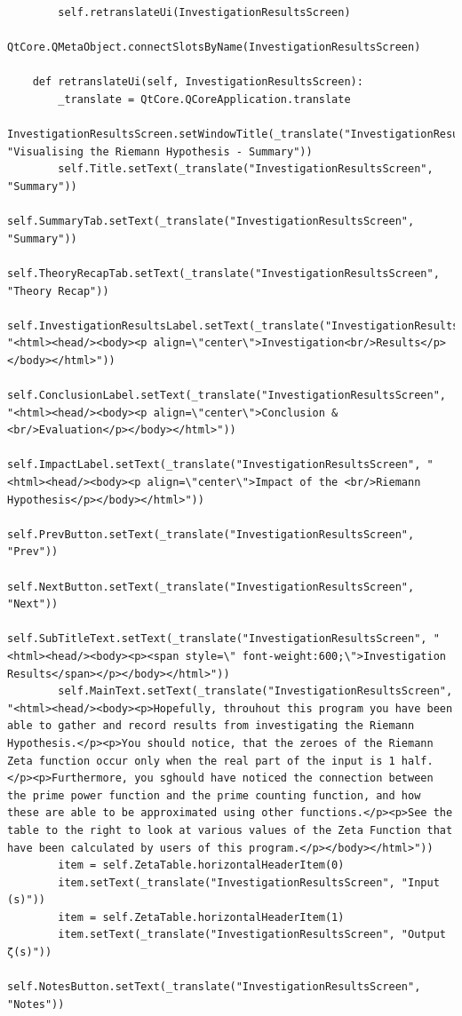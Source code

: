 \documentclass[12pt]{article}
\begin{document}
\begin{lstlisting}
        self.retranslateUi(InvestigationResultsScreen)
        QtCore.QMetaObject.connectSlotsByName(InvestigationResultsScreen)

    def retranslateUi(self, InvestigationResultsScreen):
        _translate = QtCore.QCoreApplication.translate
        InvestigationResultsScreen.setWindowTitle(_translate("InvestigationResultsScreen", "Visualising the Riemann Hypothesis - Summary"))
        self.Title.setText(_translate("InvestigationResultsScreen", "Summary"))
        self.SummaryTab.setText(_translate("InvestigationResultsScreen", "Summary"))
        self.TheoryRecapTab.setText(_translate("InvestigationResultsScreen", "Theory Recap"))
        self.InvestigationResultsLabel.setText(_translate("InvestigationResultsScreen", "<html><head/><body><p align=\"center\">Investigation<br/>Results</p></body></html>"))
        self.ConclusionLabel.setText(_translate("InvestigationResultsScreen", "<html><head/><body><p align=\"center\">Conclusion & <br/>Evaluation</p></body></html>"))
        self.ImpactLabel.setText(_translate("InvestigationResultsScreen", "<html><head/><body><p align=\"center\">Impact of the <br/>Riemann Hypothesis</p></body></html>"))
        self.PrevButton.setText(_translate("InvestigationResultsScreen", "Prev"))
        self.NextButton.setText(_translate("InvestigationResultsScreen", "Next"))
        self.SubTitleText.setText(_translate("InvestigationResultsScreen", "<html><head/><body><p><span style=\" font-weight:600;\">Investigation Results</span></p></body></html>"))
        self.MainText.setText(_translate("InvestigationResultsScreen", "<html><head/><body><p>Hopefully, throuhout this program you have been able to gather and record results from investigating the Riemann Hypothesis.</p><p>You should notice, that the zeroes of the Riemann Zeta function occur only when the real part of the input is 1 half. </p><p>Furthermore, you sghould have noticed the connection between the prime power function and the prime counting function, and how these are able to be approximated using other functions.</p><p>See the table to the right to look at various values of the Zeta Function that have been calculated by users of this program.</p></body></html>"))
        item = self.ZetaTable.horizontalHeaderItem(0)
        item.setText(_translate("InvestigationResultsScreen", "Input (s)"))
        item = self.ZetaTable.horizontalHeaderItem(1)
        item.setText(_translate("InvestigationResultsScreen", "Output ζ(s)"))
        self.NotesButton.setText(_translate("InvestigationResultsScreen", "Notes"))
\end{lstlisting}
\end{document}
